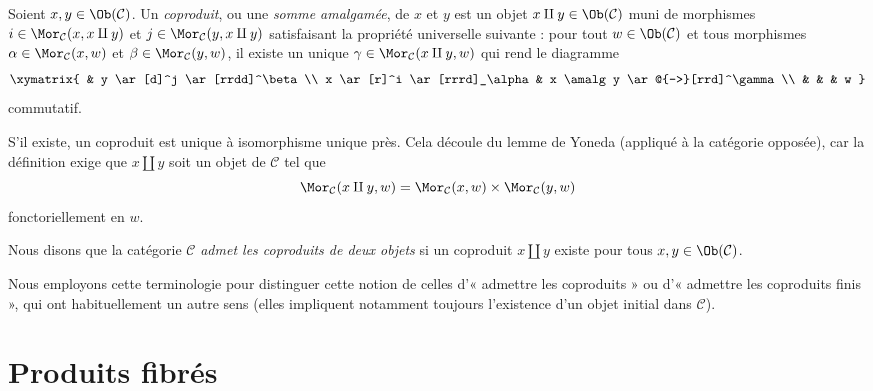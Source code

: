 \begin{definition}
\label{definition-coproducts}
Soient $x, y \in \Ob(\mathcal{C})$.
Un {\it coproduit}, ou une {\it somme amalgamée}, de $x$ et $y$ est
un objet $x \amalg y \in \Ob(\mathcal{C})$
muni de morphismes
$i \in \Mor_{\mathcal C}(x, x \amalg y)$ et
$j \in \Mor_{\mathcal C}(y, x \amalg y)$
satisfaisant la propriété universelle suivante : pour tout
$w \in \Ob(\mathcal{C})$ et tous morphismes
$\alpha \in \Mor_{\mathcal C}(x, w)$ et
$\beta \in \Mor_\mathcal{C}(y, w)$,
il existe un unique
$\gamma \in \Mor_{\mathcal C}(x \amalg y, w)$ qui rend le diagramme
$$
\xymatrix{
& y \ar[d]^j \ar[rrdd]^\beta \\
x \ar[r]^i \ar[rrrd]_\alpha & x \amalg y \ar@{-->}[rrd]^\gamma \\
& & & w
}
$$
commutatif.
\end{definition}

\noindent
S'il existe, un coproduit est unique à isomorphisme unique près.
Cela découle du lemme de Yoneda (appliqué à la catégorie opposée),
car la définition exige que $x \amalg y$ soit un objet
de $\mathcal{C}$ tel que
$$
\Mor_\mathcal{C}(x \amalg y, w) =
\Mor_\mathcal{C}(x, w) \times \Mor_\mathcal{C}(y, w)
$$
fonctoriellement en $w$.

\begin{definition}
\label{definition-has-coproducts-of-pairs}
Nous disons que la catégorie $\mathcal{C}$ {\it admet les coproduits de deux
objets} si un coproduit $x \amalg y$ existe pour tous
$x, y \in \Ob(\mathcal{C})$.
\end{definition}

\noindent
Nous employons cette terminologie pour distinguer cette notion de celles
d'« admettre les coproduits » ou d'« admettre les coproduits finis », qui ont
habituellement un autre sens (elles impliquent notamment toujours l'existence
d'un objet initial dans $\mathcal{C}$).





\section{Produits fibrés}
\label{section-fibre-products}

